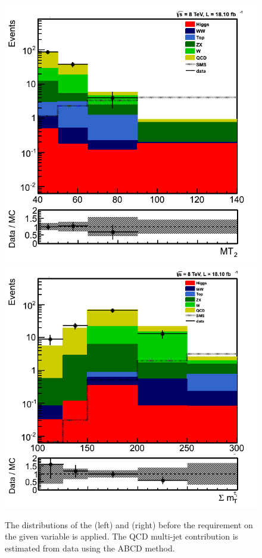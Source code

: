 \begin{figure}[iHhtb]
\centering
\includegraphics[angle=0,scale=0.35]{QCDbginTauTau/Bin1_QCDestimation.png}
\includegraphics[angle=0,scale=0.35]{QCDbginTauTau/Bin2_QCDestimation.png}

\caption{The distributions of the \mttwo (left) and \SumMT (right) before the requirement on the given variable
is applied. The QCD multi-jet contribution is estimated from data using the ABCD method.}
\label{fig:5QCDbg}
\end{figure}


